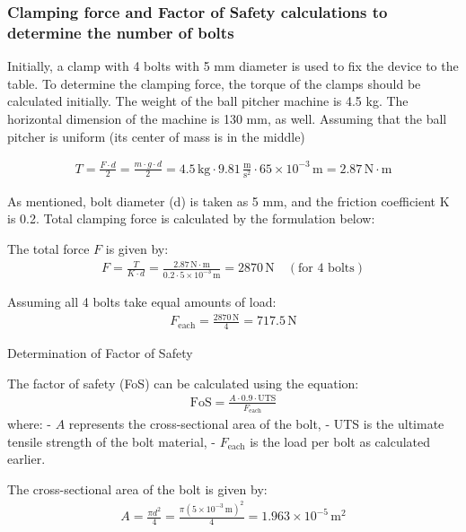 \documentclass[12pt]{article}
\begin{document}
\subsubsection{Clamping force and Factor of Safety calculations to determine the number of bolts }

Initially, a clamp with 4 bolts with 5 mm diameter is used to fix the device to the table.
To determine the clamping force, the torque of the clamps should be calculated initially. The weight of the ball pitcher machine is 4.5 kg. The horizontal dimension of the machine is 130 mm, as well. Assuming that the ball pitcher is uniform (its center of mass is in the middle)

\begin{align}
T = \frac{F \cdot d}{2} = \frac{m \cdot g \cdot d}{2} = 4.5 \, \text{kg} \cdot 9.81 \, \frac{\text{m}}{\text{s}^2} \cdot 65 \times 10^{-3} \, \text{m} = 2.87 \, \text{N} \cdot \text{m}
\end{align}

As mentioned, bolt diameter (d) is taken as 5 mm, and the friction coefficient K is 0.2.
Total clamping force is calculated by the formulation below:

The total force \( F \) is given by:
\begin{align}
F = \frac{T}{K \cdot d} = \frac{2.87 \, \text{N} \cdot \text{m}}{0.2 \cdot 5 \times 10^{-3} \, \text{m}} = 2870 \, \text{N} \quad (\text{for 4 bolts})
\end{align}

Assuming all 4 bolts take equal amounts of load:
\begin{align}
F_{\text{each}} = \frac{2870 \, \text{N}}{4} = 717.5 \, \text{N}
\end{align}

Determination of Factor of Safety

The factor of safety (FoS) can be calculated using the equation:
\begin{align}
\text{FoS} = \frac{A \cdot 0.9 \cdot \text{UTS}}{F_{\text{each}}}
\end{align}
where:
- \( A \) represents the cross-sectional area of the bolt,
- UTS is the ultimate tensile strength of the bolt material,
- \( F_{\text{each}} \) is the load per bolt as calculated earlier.

The cross-sectional area of the bolt is given by:
\begin{align}
A = \frac{\pi d^2}{4} = \frac{\pi \left( 5 \times 10^{-3} \, \text{m} \right)^2}{4} = 1.963 \times 10^{-5} \, \text{m}^2
\end{align}
\end{document}
